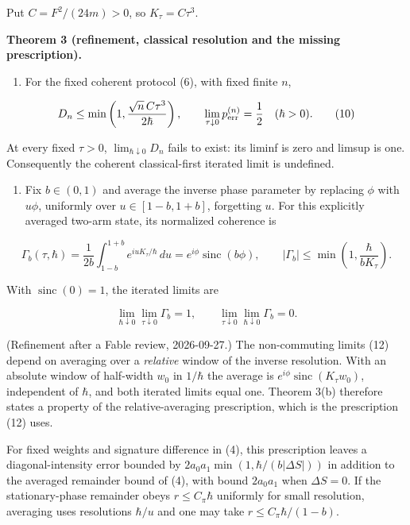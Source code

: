 \documentclass[11pt,a4paper]{article}
\newcommand{\tightlist}{\setlength{\itemsep}{0pt}\setlength{\parskip}{0pt}}
\begin{document}
Put \(C=F^2/(24m)>0\), so \(K_\tau=C\tau^3\).

\textbf{Theorem 3 (refinement, classical resolution and the missing
prescription).}

\begin{enumerate}
\def\labelenumi{(\alph{enumi})}
\tightlist
\item
  For the fixed coherent protocol (6), with fixed finite \(n\),
\end{enumerate}

\[
D_n\le\min\left(1,\frac{\sqrt n\,C\tau^3}{2\hbar}\right),
\qquad \lim_{\tau\downarrow0}p_{\rm err}^{(n)}=\frac12
\quad(\hbar>0).\tag{10}
\]

At every fixed \(\tau>0\), \(\lim_{\hbar\downarrow0}D_n\) fails to
exist: its liminf is zero and limsup is one. Consequently the coherent
classical-first iterated limit is undefined.

\begin{enumerate}
\def\labelenumi{(\alph{enumi})}
\setcounter{enumi}{1}
\tightlist
\item
  Fix \(b\in(0,1)\) and average the inverse phase parameter by replacing
  \(\phi\) with \(u\phi\), uniformly over \(u\in[1-b,1+b]\), forgetting
  \(u\). For this explicitly averaged two-arm state, its normalized
  coherence is
\end{enumerate}

\[
\Gamma_b(\tau,\hbar)
=\frac1{2b}\int_{1-b}^{1+b}e^{iuK_\tau/\hbar}\,du
=e^{i\phi}\operatorname{sinc}(b\phi),\qquad
|\Gamma_b|\le\min\left(1,\frac{\hbar}{bK_\tau}\right).
\tag{11}
\]

With \(\operatorname{sinc}(0)=1\), the iterated limits are

\[
\lim_{\hbar\downarrow0}\lim_{\tau\downarrow0}\Gamma_b=1,
\qquad
\lim_{\tau\downarrow0}\lim_{\hbar\downarrow0}\Gamma_b=0.
\tag{12}
\]

(Refinement after a Fable review, 2026-09-27.) The non-commuting limits
(12) depend on averaging over a \emph{relative} window of the inverse
resolution. With an absolute window of half-width \(w_0\) in \(1/\hbar\)
the average is \(e^{i\phi}\operatorname{sinc}(K_\tau w_0)\), independent
of \(\hbar\), and both iterated limits equal one. Theorem 3(b) therefore
states a property of the relative-averaging prescription, which is the
prescription (12) uses.

For fixed weights and signature difference in (4), this prescription
leaves a diagonal-intensity error bounded by
\(2a_0a_1\min(1,\hbar/(b|\Delta S|))\) in addition to the averaged
remainder bound of (4), with bound \(2a_0a_1\) when \(\Delta S=0\). If
the stationary-phase remainder obeys \(r\le C_\pi\hbar\) uniformly for
small resolution, averaging uses resolutions \(\hbar/u\) and one may
take \(r\le C_\pi\hbar/(1-b)\).
\end{document}
